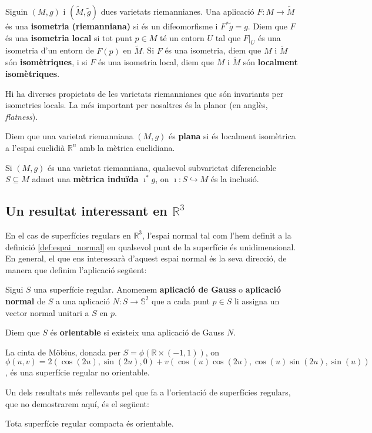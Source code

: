 \begin{defi}
    Siguin $(M,g)$ i $(\tilde M,\tilde g)$ dues varietats riemannianes. Una aplicació $F: M\to \tilde M$ és una \textbf{isometria (riemanniana)} si és un difeomorfisme i $F^*\tilde g = g$. Diem que $F$ és una \textbf{isometria local} si tot punt $p\in M$ té un entorn $U$ tal que $F|_U$ és una isometria d'un entorn de $F(p)$ en $\tilde M$. Si $F$ és una isometria, diem que $M$ i $\tilde M$ són \textbf{isomètriques}, i si $F$ és una isometria local, diem que $M$ i $\tilde M$ són \textbf{localment isomètriques}.
\end{defi}

Hi ha diverses propietats de les varietats riemannianes que són invariants per isometries locals. La més important per nosaltres és la planor (en anglès, \textit{flatness}).
\begin{defi}\label{def:flatness}
    Diem que una varietat riemanniana $(M,g)$ és \textbf{plana} si és localment isomètrica a l'espai euclidià $\mathbb R^n$ amb la mètrica euclidiana.
\end{defi}

Si $(M,g)$ és una varietat riemanniana, qualsevol subvarietat diferenciable $S\subseteq M$ admet una \textbf{mètrica induïda} $\imath^*g$, on $\imath:S\hookrightarrow M$ és la inclusió.


\subsection{Un resultat interessant en $\mathbb R^3$}

En el cas de superfícies regulars en $\mathbb R^3$, l'espai normal tal com l'hem definit a la definició \ref{def:espai_normal} en qualsevol punt de la superfície és unidimensional. En general, el que ens interessarà d'aquest espai normal és la seva direcció, de manera que definim l'aplicació següent:
\begin{defi}
    Sigui $S$ una superfície regular. Anomenem \textbf{aplicació de Gauss} o \textbf{aplicació normal} de $S$ a una aplicació $N:S\to \mathbb S^2$ que a cada punt $p\in S$ li assigna un vector normal unitari a $S$ en $p$.
\end{defi}
Diem que $S$ és \textbf{orientable} si existeix una aplicació de Gauss $N$.
\begin{ex}
    La cinta de Möbius, donada per $S=\phi(\mathbb R \times (-1,1))$, on $\phi(u,v) = 2(\cos(2u), \sin(2u), 0) + v(\cos(u)\cos(2u), \cos(u)\sin(2u), \sin(u))$, és una superfície regular no orientable.
\end{ex}
Un dels resultats més rellevants pel que fa a l'orientació de superfícies regulars, que no demostrarem aquí, és el següent:
\begin{teo}
    Tota superfície regular compacta és orientable.
\end{teo}

